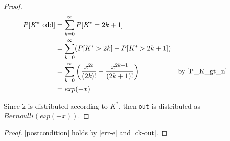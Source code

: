 \documentclass{article}
\begin{document}
\begin{proof} 
    \begin{align*} 
        P[K^{*} \text{ odd}] &= \sum_{k=0}^\infty P[K^{*} = 2k + 1] \\ 
        &= \sum_{k=0}^\infty (P[K^{*} > 2k] - P[K^{*} > 2k + 1]) \\ 
        &= \sum_{k=0}^\infty \left(\frac{x^{2k}}{(2k)!} - \frac{x^{2k + 1}}{(2k + 1)!}\right) && \text{by } \ref{P_K_gt_n} \\ 
        &= exp(-x) 
    \end{align*} 
 
    Since $\mathtt{k}$ is distributed according to $K^{*}$, then \texttt{out} is distributed as $Bernoulli(exp(-x))$. 
\end{proof} 
 
\begin{proof} 
    \ref{postcondition} holds by \ref{err-e} and \ref{ok-out}. 
\end{proof} 
 
 
 
\end{document}

